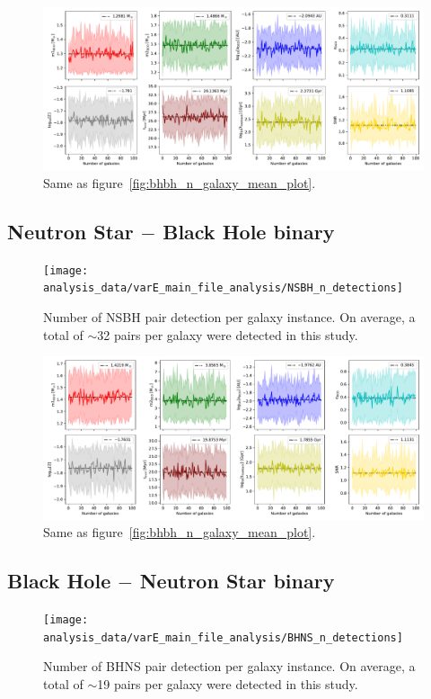 \begin{figure}[!h]
	\centering
	\includegraphics[width=\columnwidth]{analysis_data/varE_main_file_analysis/NSNS_n_galaxy_mean_plot}
	\caption{Same as figure~\ref{fig:bhbh_n_galaxy_mean_plot}.}
	\label{fig:nsns_n_galaxy_mean_plot}
\end{figure}

\subsection{Neutron Star $-$ Black Hole binary}

\begin{figure}[!h]
	\centering
	\texttt{[image: analysis\_data/varE\_main\_file\_analysis/NSBH\_n\_detections]}
	\caption{Number of NSBH pair detection per galaxy instance. On average, a total of $\sim$32 pairs per galaxy were detected in this study.}
	\label{fig:nsbhndetections}
\end{figure}	

\begin{figure}[!h]
	\centering
	\includegraphics[width=\columnwidth]{analysis_data/varE_main_file_analysis/NSBH_n_galaxy_mean_plot}
	\caption{Same as figure~\ref{fig:bhbh_n_galaxy_mean_plot}.}
	\label{fig:nsbh_n_galaxy_mean_plot}
\end{figure}

\newpage
\subsection{Black Hole $-$ Neutron Star binary}
\begin{figure}[!h]
	\centering
	\texttt{[image: analysis\_data/varE\_main\_file\_analysis/BHNS\_n\_detections]}
	\caption{Number of BHNS pair detection per galaxy instance. On average, a total of $\sim$19 pairs per galaxy were detected in this study.}
	\label{fig:bhnsndetections}
\end{figure}	

